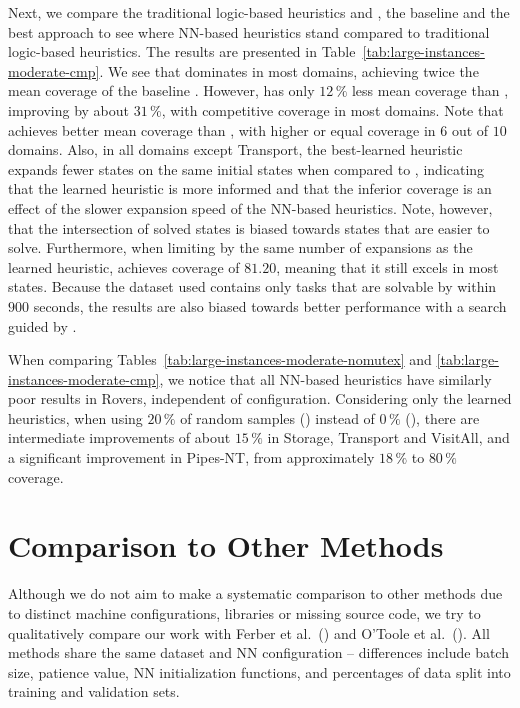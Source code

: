 Next, we compare the traditional logic-based heuristics \hff and \hgc, the baseline \hnnbase and the best approach \hnnrs to see where NN-based heuristics stand compared to traditional logic-based heuristics. The results are presented in Table~\ref{tab:large-instances-moderate-cmp}.
We see that \hff dominates in most domains, achieving twice the mean coverage of the baseline \hnnbase. However, \hnnrs has only $12\,\%$ less mean coverage than \hff, improving \hnnbase by about $31\,\%$, with competitive coverage in most domains. Note that \hnnrs achieves better mean coverage than \hgc, with higher or equal coverage in $6$ out of $10$ domains. Also, in all domains except Transport, the best-learned heuristic expands fewer states on the same initial states when compared to \hff, indicating that the learned heuristic is more informed and that the inferior coverage is an effect of the slower expansion speed of the NN-based heuristics. Note, however, that the intersection of solved states is biased towards states that are easier to solve. Furthermore, when limiting \hff by the same number of expansions as the learned heuristic, \hff achieves coverage of $81.20$, meaning that it still excels in most states. Because the dataset used contains only tasks that are solvable by \hff within $900$ seconds, the results are also biased towards better performance with a search guided by \hff. 



When comparing Tables~\ref{tab:large-instances-moderate-nomutex} and \ref{tab:large-instances-moderate-cmp}, we notice that all NN-based heuristics have similarly poor results in Rovers, independent of configuration. Considering only the learned heuristics, when using $20\,\%$ of random samples (\hnnrs) instead of $0\,\%$ (\hnnbfsrwl{\meanfx}), there are intermediate improvements of about $15\,\%$ in Storage, Transport and VisitAll, and a significant improvement in Pipes-NT, from approximately $18\,\%$ to $80\,\%$ coverage.

\section{Comparison to Other Methods}
\label{sec:comparison}

Although we do not aim to make a systematic comparison to other methods due to distinct machine configurations, libraries or missing source code, we try to qualitatively compare our work with Ferber et al.~(\citeyear{Ferber.etal/2022}) and O'Toole et al.~(\citeyear{OToole/2022}). All methods share the same dataset and NN configuration -- differences include batch size, patience value, NN initialization functions, and percentages of data split into training and validation sets.

